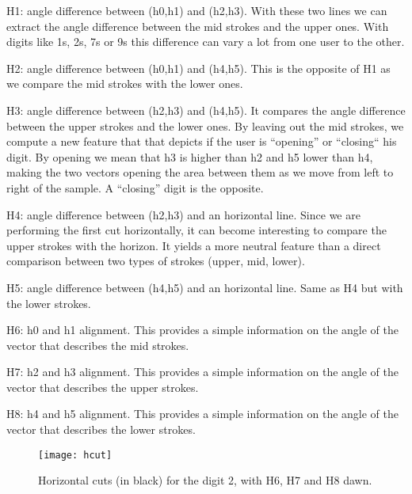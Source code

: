 \documentclass[a4paper]{article}
\begin{document}
{\vspace{2mm}
\begin{listCustom}
	\item H1: angle difference between (h0,h1) and (h2,h3). With these two lines we can extract the angle difference between the mid strokes and the upper ones. With digits like 1s,  2s, 7s or 9s this difference can vary a lot from one user to the other.
	\item H2: angle difference between (h0,h1) and (h4,h5). This is the opposite of H1 as we compare the mid strokes with the lower ones.
	\item H3: angle difference between (h2,h3) and (h4,h5). It compares the angle difference between the upper strokes and the lower ones. By leaving out the mid strokes, we compute a new feature that that depicts if the user is “opening” or “closing“ his digit. By opening we mean that h3 is higher than h2 and h5 lower than h4, making the two vectors opening the area between them as we move from left to right of the sample. A “closing” digit is the opposite.
	\item H4: angle difference between (h2,h3) and an horizontal line. Since we are performing the first cut horizontally, it can become interesting to compare the upper strokes with the horizon. It yields a more neutral feature than a direct comparison between two types of strokes (upper, mid, lower).
	\item H5: angle difference between (h4,h5) and an horizontal line. Same as H4 but with the lower strokes.
	\item H6: h0 and h1 alignment. This provides a simple information on the angle of the vector that describes the mid strokes.
	\item H7: h2 and h3 alignment. This provides a simple information on the angle of the vector that describes the upper strokes.
	\item H8: h4 and h5 alignment. This provides a simple information on the angle of the vector that describes the lower strokes.
\end{listCustom}
\vspace{2mm}

\vspace{1mm}
\begin{figure}[h!]
  
  \centering
    \texttt{[image: hcut]}
  \caption{Horizontal cuts (in black) for the digit 2, with H6, H7 and H8 dawn.}
\end{figure}

}
\end{document}
